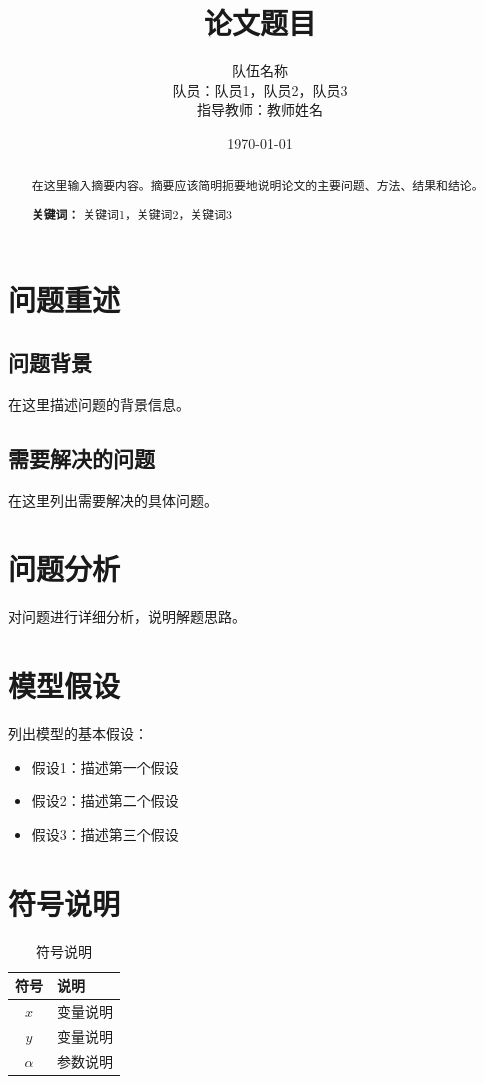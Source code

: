 \documentclass[12pt,a4paper]{article}
\title{\textbf{论文题目}}
\author{队伍名称 \\ 队员：队员1，队员2，队员3 \\ 指导教师：教师姓名}
\date{\today}
\begin{document}
\maketitle
\thispagestyle{empty}

\begin{abstract}
在这里输入摘要内容。摘要应该简明扼要地说明论文的主要问题、方法、结果和结论。

\textbf{关键词：} 关键词1，关键词2，关键词3
\end{abstract}

\newpage

\tableofcontents
\newpage

\section{问题重述}

\subsection{问题背景}
在这里描述问题的背景信息。

\subsection{需要解决的问题}
在这里列出需要解决的具体问题。

\section{问题分析}

对问题进行详细分析，说明解题思路。

\section{模型假设}

列出模型的基本假设：

\begin{itemize}
    \item 假设1：描述第一个假设
    \item 假设2：描述第二个假设
    \item 假设3：描述第三个假设
\end{itemize}

\section{符号说明}

\begin{table}[H]
\centering
\caption{符号说明}
\begin{tabular}{cl}
\toprule
符号 & 说明 \\
\midrule
$x$ & 变量说明 \\
$y$ & 变量说明 \\
$\alpha$ & 参数说明 \\
\bottomrule
\end{tabular}
\end{table}
\end{document}
